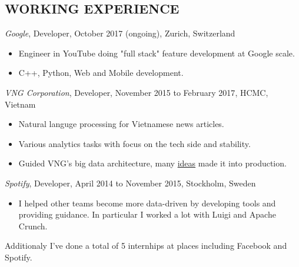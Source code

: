 \documentclass[11pt]{res} %
\begin{document}
\begin{resume}
\section{WORKING EXPERIENCE}
  \emph{Google}, {\footnotesize Developer, October 2017 (ongoing)}, Zurich, Switzerland
\vspace{0.2in}
   \begin{itemize}
     \item Engineer in YouTube doing "full stack" feature development at Google scale.
     \item C++, Python, Web and Mobile development.
 \end{itemize}

\emph{VNG Corporation}, {\footnotesize Developer, November 2015 to February 2017}, HCMC, Vietnam
\vspace{0.2in}
   \begin{itemize}
     \item Natural languge processing for Vietnamese news articles.
     \item Various analytics tasks with focus on the tech side and stability.
     \item Guided VNG's big data architecture, many \href{http://luigi.readthedocs.io/en/stable/luigi_patterns.html#atomic-writes-problem}{ideas} made it into production.
 \end{itemize}

\emph{Spotify}, {\footnotesize Developer, April 2014 to November 2015}, Stockholm, Sweden
\vspace{0.2in}
   \begin{itemize}
     \item I helped other teams become more data-driven by developing tools and
     providing guidance.  In particular I worked a lot with Luigi and Apache
     Crunch.
 \end{itemize}

Additionaly I've done a total of 5 internhips at places including Facebook and Spotify.


\end{resume}
\end{document}
